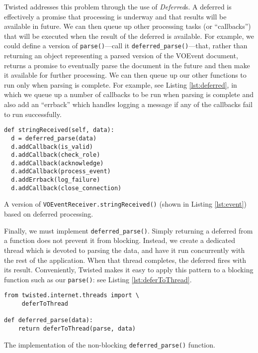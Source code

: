 \documentclass[5p,authoryear]{elsarticle}
\begin{document}
Twisted addresses this problem through the use of \textit{Deferred}s. A
deferred is effectively a promise that processing is underway and that results
will be available in future. We can then queue up other processing tasks (or
``callbacks'') that will be executed when the result of the deferred is
available. For example, we could define a version of
\texttt{parse()}---call it
\texttt{deferred\_parse()}---that, rather than returning an object
representing a parsed version of the VOEvent document, returns a promise to
eventually parse the document in the future and then make it available for
further processing. We can then queue up our other functions to run only when
parsing is complete. For example, see Listing \ref{lst:deferred}, in which we
queue up a number of callbacks to be run when parsing is complete and also add
an ``errback'' which handles logging a message if any of the callbacks fail to
run successfully.

\begin{listing}
\begin{verbatim}
def stringReceived(self, data):
  d = deferred_parse(data)
  d.addCallback(is_valid)
  d.addCallback(check_role)
  d.addCallback(acknowledge)
  d.addCallback(process_event)
  d.addErrback(log_failure)
  d.addCallback(close_connection)
\end{verbatim}
\caption{A version of \texttt{VOEventReceiver.stringReceived()} (shown in
Listing \ref{lst:event}) based on deferred processing.}
\label{lst:deferred}
\end{listing}

Finally, we must implement \texttt{deferred\_parse()}.  Simply returning a
deferred from a function does not prevent it from blocking.  Instead, we
create a dedicated thread which is devoted to parsing the data, and have it
run concurrently with the rest of the application. When that thread completes,
the deferred fires with its result. Conveniently, Twisted makes it easy to
apply this pattern to a blocking function such as our \texttt{parse()}: see
Listing \ref{lst:deferToThread}.

\begin{listing}
\begin{verbatim}
from twisted.internet.threads import \
     deferToThread

def deferred_parse(data):
    return deferToThread(parse, data)
\end{verbatim}
\caption{The implementation of the non-blocking \texttt{deferred\_parse()} function.}
\label{lst:deferToThread}
\end{listing}
\end{document}
